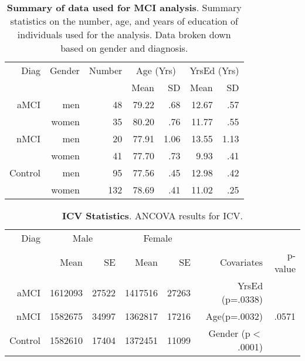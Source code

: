 \documentclass[12pt]{article}
\newcommand\T{\rule{0pt}{2.6ex}}
\newcommand\B{\rule[-1.2ex]{0pt}{0pt}}
\begin{document}
\begin{table}[t]
	\centering
	\begin{tabular}{rrrrrrr}
		\hline
		Diag \T& Gender & Number & \multicolumn{2}{c}{Age (Yrs)} & \multicolumn{2}{c}{YrsEd (Yrs)} \\
		& \B & & Mean & SD & Mean & SD \\ \hline
		aMCI\T& men & 48 & 79.22 & .68 & 12.67 & .57 \\
		& women & 35 & 80.20 & .76 & 11.77 & .55 \\
		nMCI & men & 20 & 77.91 & 1.06 & 13.55 & 1.13 \\ 		
		& women & 41 & 77.70 & .73 & 9.93 & .41 \\
		Control & men & 95 & 77.56 & .45 & 12.98 & .42\\
		& women & 132 & 78.69 & .41 & 11.02 & .25 \\
	\end{tabular}
	\caption{\textbf{Summary of data used for MCI analysis}.  Summary statistics on the number, age, and years of education of individuals used for the analysis.  Data broken down based on gender and diagnosis.}
	\label{wave1data}
\end{table}

\newpage
\begin{table}[h]
	\centering
	\footnotesize
	\begin{tabular}{rrrrrrr}
	\hline
	Diag\T & \multicolumn{2}{c}{Male} & \multicolumn{2}{c}{Female} & &  \\
	& Mean & SE & Mean & SE & Covariates & p-value\\ \hline
	aMCI\T & 1612093 & 27522 & 1417516 & 27263 & YrsEd (p=.0338) & \\
	nMCI & 1582675 & 34997 & 1362817 & 17216 &Age(p=.0032) & .0571\\
	Control & 1582610 & 17404 & 1372451 & 11099 & Gender (p$<$.0001)&\\
	\end{tabular}
	\caption{\textbf{ICV Statistics}.  ANCOVA results for ICV.}
	\label{Wave1.ICV.stats}
\end{table}
\end{document}

